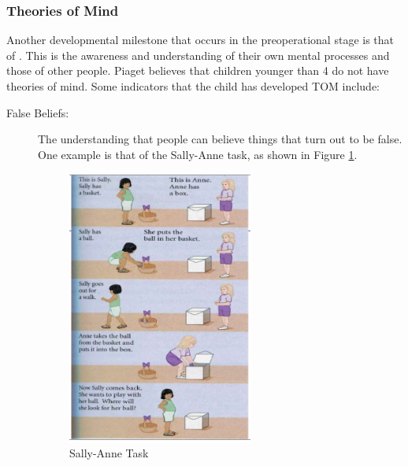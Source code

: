 \documentclass[../main/main.tex]{subfiles}
\begin{document}
\subsubsection{Theories of Mind} 
Another developmental milestone that occurs in the preoperational stage is that of . This is the awareness and understanding of their own mental processes and those of other people. Piaget believes that children younger than 4 do not have theories of mind. Some indicators that the child has developed TOM include:
\begin{description}
  \item[False Beliefs:] The understanding that people can believe things that turn out to be false. One example is that of the Sally-Anne task, as shown in Figure \ref{fig:3-3-sally}.

    \begin{figure}[h!]
      \centering
      \includegraphics[width=0.6\textwidth]{../images/3-3-sally}
      \caption{Sally-Anne Task}
      \label{fig:3-3-sally}
    \end{figure}


\end{description}
\end{document}
